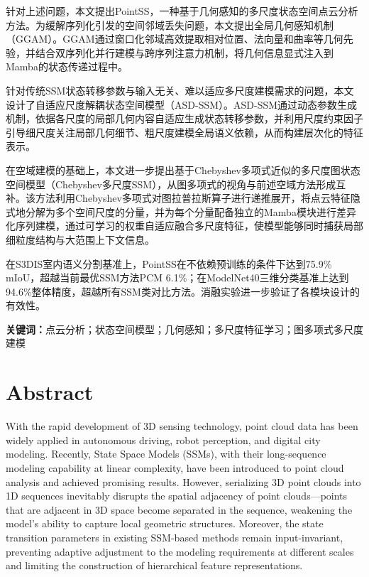 \documentclass[12pt,a4paper,openany,oneside]{ctexbook}
\theoremstyle{definition}
\theoremstyle{remark}
\begin{document}
针对上述问题，本文提出PointSS，一种基于几何感知的多尺度状态空间点云分析方法。为缓解序列化引发的空间邻域丢失问题，本文提出全局几何感知机制（GGAM）。GGAM通过窗口化邻域高效提取相对位置、法向量和曲率等几何先验，并结合双序列化并行建模与跨序列注意力机制，将几何信息显式注入到Mamba的状态传递过程中。

针对传统SSM状态转移参数与输入无关、难以适应多尺度建模需求的问题，本文设计了自适应尺度解耦状态空间模型（ASD-SSM）。ASD-SSM通过动态参数生成机制，依据各尺度的局部几何内容自适应生成状态转移参数，并利用尺度约束因子引导细尺度关注局部几何细节、粗尺度建模全局语义依赖，从而构建层次化的特征表示。

在空域建模的基础上，本文进一步提出基于Chebyshev多项式近似的多尺度图状态空间模型（Chebyshev多尺度SSM），从图多项式的视角与前述空域方法形成互补。该方法利用Chebyshev多项式对图拉普拉斯算子进行递推展开，将点云特征隐式地分解为多个空间尺度的分量，并为每个分量配备独立的Mamba模块进行差异化序列建模，通过可学习的权重自适应融合多尺度特征，使模型能够同时捕获局部细粒度结构与大范围上下文信息。

在S3DIS室内语义分割基准上，PointSS在不依赖预训练的条件下达到75.9\% mIoU，超越当前最优SSM方法PCM 6.1\%；在ModelNet40三维分类基准上达到94.6\%整体精度，超越所有SSM类对比方法。消融实验进一步验证了各模块设计的有效性。

\vspace{1em}
\noindent\textbf{关键词：}点云分析；状态空间模型；几何感知；多尺度特征学习；图多项式多尺度建模

\chapter*{Abstract}

With the rapid development of 3D sensing technology, point cloud data has been widely applied in autonomous driving, robot perception, and digital city modeling. Recently, State Space Models (SSMs), with their long-sequence modeling capability at linear complexity, have been introduced to point cloud analysis and achieved promising results. However, serializing 3D point clouds into 1D sequences inevitably disrupts the spatial adjacency of point clouds—points that are adjacent in 3D space become separated in the sequence, weakening the model's ability to capture local geometric structures. Moreover, the state transition parameters in existing SSM-based methods remain input-invariant, preventing adaptive adjustment to the modeling requirements at different scales and limiting the construction of hierarchical feature representations.
\end{document}
